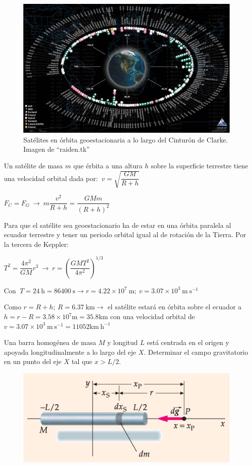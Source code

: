 \begin{figure}[H]
	\centering
	\includegraphics[width=1\textwidth]{imagenes/imagenes15/T15IM10.png}
	\caption*{Satélites en órbita geoestacionaria a lo largo del Cinturón de Clarke. Imagen de ``raiden.tk''  }
\end{figure}

Un satélite de masa $m$ que érbita a una altura $h$ sobre la superficie terrestre tiene una velocidad orbital dada por: 
$\ v=\sqrt{\dfrac{GM}{R+h}}$

\textcolor{gris}{$F_C=F_G \ \to \ m \dfrac {v^2}{R+h}=\dfrac{GMm}{(R+h)^2}$}

Para que el satélite sea geoestacionario ha de estar en una órbita paralela al ecuador terrestre y tener un periodo orbital igual al de rotación de la Tierra. Por la tercera de Keppler:

$T^2=\dfrac{4\pi^2}{GM} r^3 \ \to \ r=\left(\dfrac{GMT^2}{4\pi^2} \right)^{1/3}$

Con $\ T=24\ \mathrm{h}=86400\ \mathrm{s} \to r=4.22\times 10^{7}\ \mathrm{m};\ v=3.07\times 10^{3}\ \mathrm{m\ s}^{-1}$  

Como $r=R+h; \ R=6.37 \ \mathrm{km} \to$ el satélite estará en órbita sobre el ecuador a $h=r-R=3.58\times 10^7 \mathrm{m}=35.8 \mathrm{km}$ con una velocidad orbital de $v=3.07\times 10^{3}\ \mathrm{m\ s}^{-1}=11052 \mathrm{km\ h}^{-1}$

\begin{prob}
Una barra homogénea de masa $M$ y longitud $L$ está centrada en el origen y apoyada longitudinalmente a lo largo del eje $X$. Determinar el campo gravitatorio en un punto del eje $X$ tal que $x>L/2$. 	
\end{prob}

\begin{figure}[H]
	\centering
	\includegraphics[width=1\textwidth]{imagenes/imagenes15/T15IM11.png}
\end{figure}

